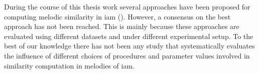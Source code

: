 During the course of this thesis work several approaches have been proposed for computing melodic similarity in \gls{iam} (). However, a consensus on the best approach has not been reached. This is mainly because these approaches are evaluated using different datasets and under different experimental setup. To the best of our knowledge there has not been any study that systematically evaluates the influence of different choices of procedures and parameter values involved in similarity computation in melodies of \gls{iam}.







